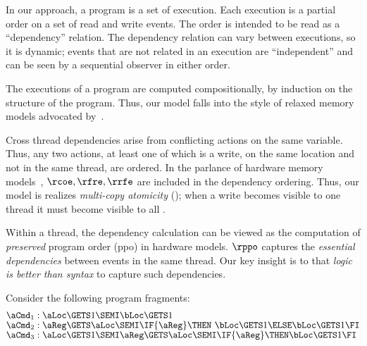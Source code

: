 In our approach, a program is a set of execution.  Each execution is a partial order on a set of read and write events.  The order is intended to be read as a ``dependency'' relation.  The dependency relation can vary between executions, so it is dynamic; events that are not related in an execution are ``independent'' and can be seen by a sequential observer in either order.   

The executions of a program are computed compositionally, by induction on the structure of the program.  Thus, our model falls into the style of relaxed memory models advocated by~\citet{Batty17}.  

Cross thread dependencies arise from conflicting actions on the same variable.  Thus, any two actions, at least one of which is a write, on the same location and not in the same thread, are ordered.   In the parlance of hardware memory models~\citep{alglave}, $\rcoe,\rfre,\rrfe$ are included in the dependency ordering.  Thus, our model is realizes \emph{multi-copy atomicity} (\mca); when
a write becomes visible to one thread it must become visible to
all
\citep{DBLP:journals/pacmpl/PulteFDFSS18}.   
  

Within a thread, the dependency calculation can be viewed as the computation of \emph{preserved} program order (\textsf{ppo}) in hardware models.   $\rppo$ captures the \emph{essential dependencies} between events in the same thread.  Our key insight is to that  \emph{logic is better than syntax} to capture such dependencies.  

Consider the following program fragments: \begingroup \allowdisplaybreaks
\begin{align*}
  & \aCmd_1: \aLoc \GETS 1 \SEMI \bLoc \GETS 1
  \\[-1ex] & \aCmd_2: \aReg \GETS \aLoc \SEMI \IF{\aReg} \THEN\ \bLoc \GETS 1 \ELSE \bLoc \GETS 1  \FI
  \\[-1ex] & \aCmd_3: \aLoc \GETS 1 \SEMI \aReg \GETS \aLoc \SEMI \IF{\aReg} \THEN \bLoc \GETS 1 \FI
\end{align*}
\endgroup

